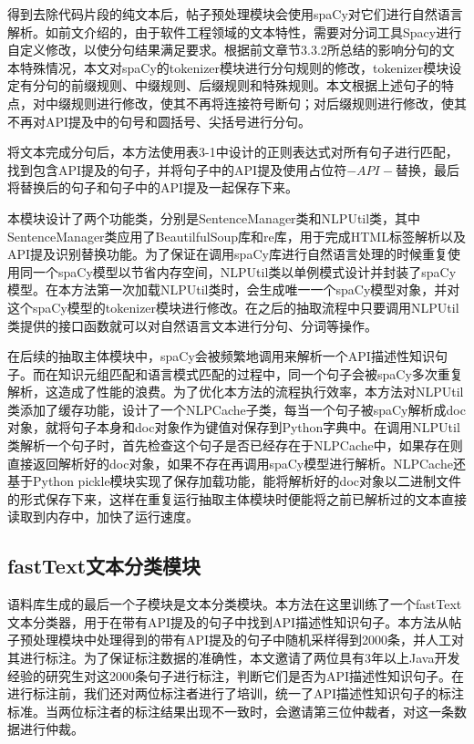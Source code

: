 得到去除代码片段的纯文本后，帖子预处理模块会使用spaCy对它们进行自然语言解析。如前文介绍的，由于软件工程领域的文本特性，需要对分词工具Spacy进行自定义修改，以使分句结果满足要求。根据前文章节3.3.2所总结的影响分句的文本特殊情况，本文对spaCy的tokenizer模块进行分句规则的修改，tokenizer模块设定有分句的前缀规则、中缀规则、后缀规则和特殊规则。本文根据上述句子的特点，对中缀规则进行修改，使其不再将连接符号断句；对后缀规则进行修改，使其不再对API提及中的句号和圆括号、尖括号进行分句。

将文本完成分句后，本方法使用表3-1中设计的正则表达式对所有句子进行匹配，找到包含API提及的句子，并将句子中的API提及使用占位符$-API-$替换，最后将替换后的句子和句子中的API提及一起保存下来。

本模块设计了两个功能类，分别是SentenceManager类和NLPUtil类，其中SentenceManager类应用了BeautilfulSoup库和re库，用于完成HTML标签解析以及API提及识别替换功能。为了保证在调用spaCy库进行自然语言处理的时候重复使用同一个spaCy模型以节省内存空间，NLPUtil类以单例模式设计并封装了spaCy模型。在本方法第一次加载NLPUtil类时，会生成唯一一个spaCy模型对象，并对这个spaCy模型的tokenizer模块进行修改。在之后的抽取流程中只要调用NLPUtil类提供的接口函数就可以对自然语言文本进行分句、分词等操作。

在后续的抽取主体模块中，spaCy会被频繁地调用来解析一个API描述性知识句子。而在知识元组匹配和语言模式匹配的过程中，同一个句子会被spaCy多次重复解析，这造成了性能的浪费。为了优化本方法的流程执行效率，本方法对NLPUtil类添加了缓存功能，设计了一个NLPCache子类，每当一个句子被spaCy解析成doc对象，就将句子本身和doc对象作为键值对保存到Python字典中。在调用NLPUtil类解析一个句子时，首先检查这个句子是否已经存在于NLPCache中，如果存在则直接返回解析好的doc对象，如果不存在再调用spaCy模型进行解析。NLPCache还基于Python pickle模块实现了保存加载功能，能将解析好的doc对象以二进制文件的形式保存下来，这样在重复运行抽取主体模块时便能将之前已解析过的文本直接读取到内存中，加快了运行速度。

\subsection{fastText文本分类模块}
语料库生成的最后一个子模块是文本分类模块。本方法在这里训练了一个fastText文本分类器，用于在带有API提及的句子中找到API描述性知识句子。本方法从帖子预处理模块中处理得到的带有API提及的句子中随机采样得到2000条，并人工对其进行标注。为了保证标注数据的准确性，本文邀请了两位具有3年以上Java开发经验的研究生对这2000条句子进行标注，判断它们是否为API描述性知识句子。在进行标注前，我们还对两位标注者进行了培训，统一了API描述性知识句子的标注标准。当两位标注者的标注结果出现不一致时，会邀请第三位仲裁者，对这一条数据进行仲裁。

